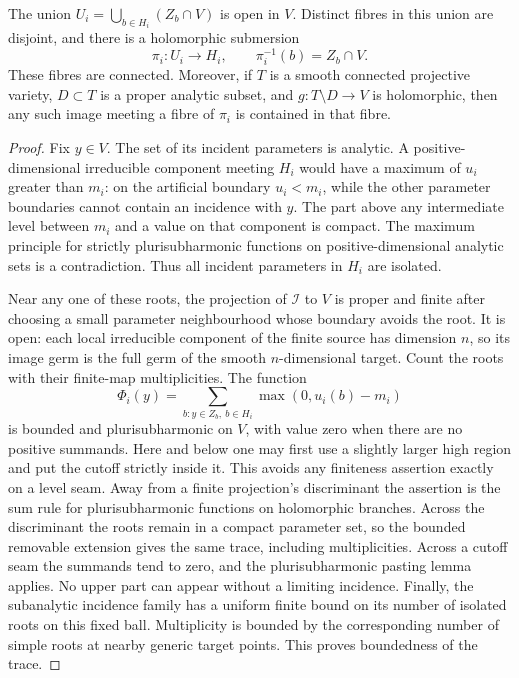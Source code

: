 \begin{lemma}\label{quo:incidence}
The union \(U_i=\bigcup_{b\in H_i}(Z_b\cap V)\) is open in \(V\).
Distinct fibres in this union are disjoint, and there is a
holomorphic submersion
\[
 \pi_i:U_i\longrightarrow H_i,
 \qquad \pi_i^{-1}(b)=Z_b\cap V.
\]
These fibres are connected. Moreover, if \(T\) is a smooth connected
projective variety, \(D\subset T\) is a proper analytic subset,
and \(g:T\setminus D\to V\) is holomorphic, then any such image
meeting a fibre of \(\pi_i\) is contained in that fibre.
\end{lemma}
\begin{proof}
Fix \(y\in V\). The set of its incident parameters is analytic.
A positive-dimensional irreducible component meeting \(H_i\)
would have a maximum of \(u_i\) greater than \(m_i\): on the
artificial boundary \(u_i<m_i\), while the other parameter
boundaries cannot contain an incidence with \(y\). The part above
any intermediate level between \(m_i\) and a value on that component
is compact. The maximum principle for strictly plurisubharmonic
functions on positive-dimensional analytic sets is a contradiction.
Thus all incident parameters in \(H_i\) are isolated.

Near any one of these roots, the projection of \(\mathcal I\) to
\(V\) is proper and finite after choosing a small parameter
neighbourhood whose boundary avoids the root. It is open: each
local irreducible component of the finite source has dimension
\(n\), so its image germ is the full germ of the smooth
\(n\)-dimensional target. Count the roots with their finite-map
multiplicities. The function
\begin{equation}\label{quo:trace}
 \Phi_i(y)=\sum_{b:y\in Z_b,\ b\in H_i}
                    \max(0,u_i(b)-m_i)
\end{equation}
is bounded and plurisubharmonic on \(V\), with value zero when
there are no positive summands. Here and below one may first use
a slightly larger high region and put the cutoff strictly inside
it. This avoids any finiteness assertion exactly on a level seam.
Away from a finite projection's discriminant the assertion is the
sum rule for plurisubharmonic functions on holomorphic branches.
Across the discriminant the roots remain in a compact parameter
set, so the bounded removable extension gives the same trace,
including multiplicities. Across a cutoff seam the summands tend
to zero, and the plurisubharmonic pasting lemma applies. No upper
part can appear without a limiting incidence. Finally, the
subanalytic incidence family has a uniform finite bound on its
number of isolated roots on this fixed ball. Multiplicity is
bounded by the corresponding number of simple roots at nearby
generic target points. This proves boundedness of the trace.


\end{proof}
